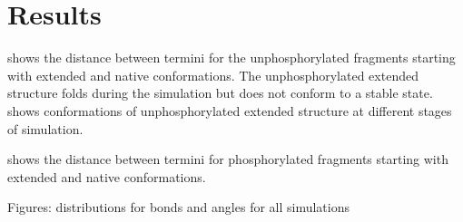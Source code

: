 \section{Results} %
\label{sec:results}


 shows the distance between termini for the unphosphorylated fragments starting with extended and native conformations.
The unphosphorylated extended structure folds during the simulation but does not conform to a stable state.
 shows conformations of unphosphorylated extended structure at different stages of simulation.

 shows the distance between termini for phosphorylated fragments starting with extended and native conformations.







Figures: distributions for bonds and angles for all simulations

